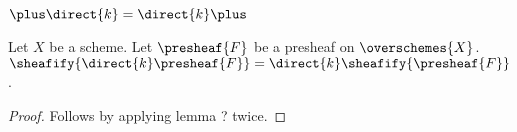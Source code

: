 \begin{lemma}
$\plus\direct{k} = \direct{k}\plus$
\end{lemma}

\begin{lemma}
Let $X$ be a scheme.
Let $\presheaf{F}$ be a presheaf on $\overschemes{X}$.
$\sheafify{\direct{k}\presheaf{F}} = \direct{k}\sheafify{\presheaf{F}}$.
\end{lemma}
\begin{proof}
Follows by applying lemma ? twice.
\end{proof}